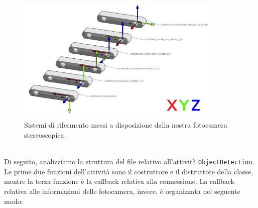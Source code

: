 \documentclass{report}
\begin{document}
\begin{figure}[h!]
	\centering
	\includegraphics[height=6cm]{immagini/CoordinateSystem}
	\caption{Sistemi di rifermento messi a disposizione dalla nostra fotocamera stereoscopica.}
	\label{figura:sdrZED}
\end{figure}
\\Di seguito, analizziamo la struttura del file relativo all'attività \texttt{ObjectDetection}. Le prime due funzioni dell'attività sono il costruttore e il distruttore della classe, mentre la terza funzione è la callback relativa alla connessione. La callback relativa alle informazioni delle fotocamera, invece, è organizzata nel seguente modo: 
\end{document}
